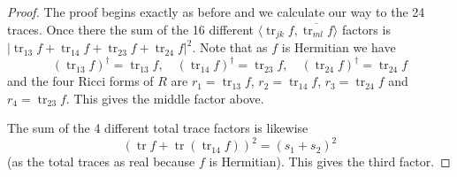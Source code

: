 \documentclass[10pt,a4paper]{amsart}
\theoremstyle{definition}
\def\ov#1{\overline{#1}}
\DeclareMathOperator{\tr}{tr}
\begin{document}
\begin{proof}
The proof begins exactly as before and we calculate our way to the 24 traces.
Once there
the sum of the 16 different $\langle \tr_{jk} f, \ov{\tr_{ml} f} \rangle$
factors is $|\!\tr_{13} f + \tr_{14} f + \tr_{23} f + \tr_{24} f|^2$.
Note that as $f$ is Hermitian we have
$$
(\tr_{13} f)^\dagger = \tr_{13} f,
\quad
(\tr_{14} f)^\dagger = \tr_{23} f,
\quad
(\tr_{24} f)^\dagger = \tr_{24} f
$$
and the four Ricci forms of $R$ are $r_1 = \tr_{13} f$, $r_2 = \tr_{14} f$,
$r_3 = \tr_{24} f$ and $r_4 = \tr_{23} f$.
This gives the middle factor above.

The sum of the 4 different total trace factors is likewise
$$
(\tr f + \tr(\tr_{14} f))^2 = (s_1 + s_2)^2
$$
(as the total traces as real because $f$ is Hermitian).
This gives the third factor.


\end{proof}
\end{document}
